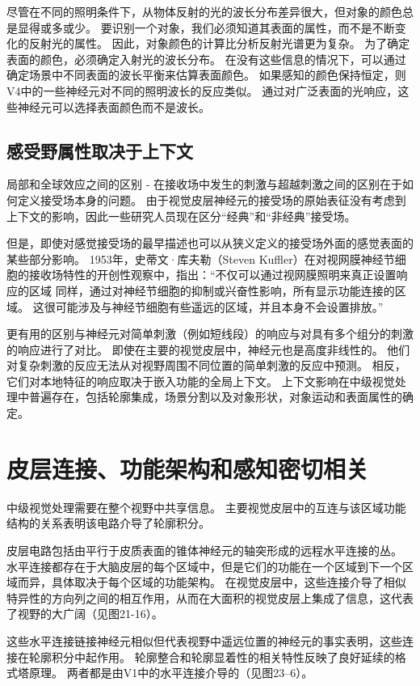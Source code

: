 尽管在不同的照明条件下，从物体反射的光的波长分布差异很大，但对象的颜色总是显得或多或少。
要识别一个对象，我们必须知道其表面的属性，而不是不断变化的反射光的属性。
因此，对象颜色的计算比分析反射光谱更为复杂。
为了确定表面的颜色，必须确定入射光的波长分布。
在没有这些信息的情况下，可以通过确定场景中不同表面的波长平衡来估算表面颜色。
如果感知的颜色保持恒定，则V4中的一些神经元对不同的照明波长的反应类似。
通过对广泛表面的光响应，这些神经元可以选择表面颜色而不是波长。


\subsection{感受野属性取决于上下文}

局部和全球效应之间的区别 - 在接收场中发生的刺激与超越刺激之间的区别在于如何定义接受场本身的问题。 
由于视觉皮层神经元的接受场的原始表征没有考虑到上下文的影响，因此一些研究人员现在区分“经典”和“非经典”接受场。


但是，即使对感觉接受场的最早描述也可以从狭义定义的接受场外面的感觉表面的某些部分影响。 
1953年，史蒂文·库夫勒（Steven Kuffler）在对视网膜神经节细胞的接收场特性的开创性观察中，指出：“不仅可以通过视网膜照明来真正设置响应的区域 同样，通过对神经节细胞的抑制或兴奋性影响，所有显示功能连接的区域。 
这很可能涉及与神经节细胞有些遥远的区域，并且本身不会设置排放。”


更有用的区别与神经元对简单刺激（例如短线段）的响应与对具有多个组分的刺激的响应进行了对比。
即使在主要的视觉皮层中，神经元也是高度非线性的。 
他们对复杂刺激的反应无法从对视野周围不同位置的简单刺激的反应中预测。
相反，它们对本地特征的响应取决于嵌入功能的全局上下文。
上下文影响在中级视觉处理中普遍存在，包括轮廓集成，场景分割以及对象形状，对象运动和表面属性的确定。



\section{皮层连接、功能架构和感知密切相关}
中级视觉处理需要在整个视野中共享信息。
主要视觉皮层中的互连与该区域功能结构的关系表明该电路介导了轮廓积分。


皮层电路包括由平行于皮质表面的锥体神经元的轴突形成的远程水平连接的丛。
水平连接都存在于大脑皮层的每个区域中，但是它们的功能在一个区域到下一个区域而异，具体取决于每个区域的功能架构。
在视觉皮层中，这些连接介导了相似特异性的方向列之间的相互作用，从而在大面积的视觉皮层上集成了信息，这代表了视野的大广阔（见图21-16）。


这些水平连接链接神经元相似但代表视野中遥远位置的神经元的事实表明，这些连接在轮廓积分中起作用。
轮廓整合和轮廓显着性的相关特性反映了良好延续的格式塔原理。 两者都是由V1中的水平连接介导的（见图23–6）。


